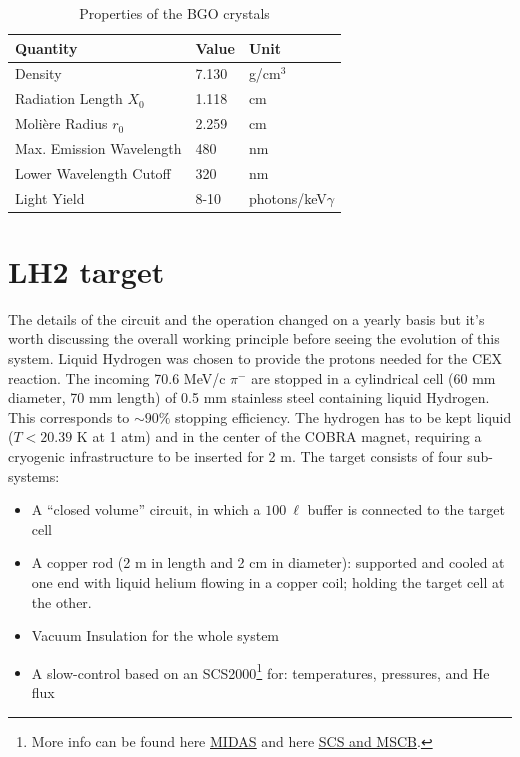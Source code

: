 \begin{refsection}
    \begin{table}[]
        \centering
        \caption{Properties of the BGO crystals}
        \label{tab:BGO:properties}
        \begin{tabular}{@{}lll@{}}
        \toprule
        \textbf{Quantity}            & \textbf{Value} & \textbf{Unit} \\ \midrule
        Density                      & 7.130          & g/cm$^3$      \\
        Radiation Length $X_0$      & 1.118          & cm            \\
        Molière Radius $r_0$        & 2.259          & cm            \\
        Max. Emission Wavelength    & 480            & nm            \\
        Lower Wavelength Cutoff     & 320            & nm            \\
        Light Yield                 & 8-10           & photons/keV$\gamma$ \\ \bottomrule
        \end{tabular}
    \end{table}

\section{LH2 target}
    The details of the circuit and the operation changed on a yearly basis but it's worth discussing the overall working principle before seeing the evolution of this system.
    Liquid Hydrogen was chosen to provide the protons needed for the CEX reaction.  
    The incoming 70.6 MeV/c $\pi^-$ are stopped in a cylindrical cell (60 mm diameter, 70 mm length) of 0.5 mm stainless steel containing liquid Hydrogen. 
    This corresponds to $\sim 90\%$ stopping efficiency.
    The hydrogen has to be kept liquid ($T<20.39$ K at 1 atm) and in the center of the COBRA magnet, requiring a cryogenic infrastructure to be inserted for 2 m.
    The target consists of four sub-systems:
    \begin{itemize}
        \item A ``closed volume'' circuit, in which a $100\ \ell$ buffer is connected to the target cell 
        \item  A copper rod (2 m in length and 2 cm in diameter): supported and cooled at one end with liquid helium flowing in a copper coil; holding the target cell at the other.
        \item Vacuum Insulation for the whole system
        \item A slow-control based on an SCS2000\footnote{More info can be found here \href{https://daq00.triumf.ca/MidasWiki/index.php/Main_Page}{\underline{MIDAS}} and here \href{https://www.psi.ch/en/ltp-electronics/www-documents}{\underline{SCS and MSCB}}.} for: temperatures, pressures, and He flux
    \end{itemize}
    

\end{refsection}
